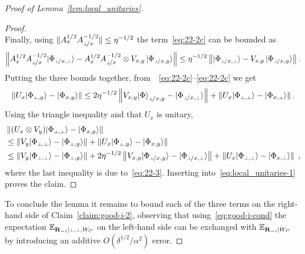 \begin{proof}[Proof of Lemma~\ref{lem:local_unitaries}]
\begin{proof}
$$$$
Finally, using $\|A_x^{1/2} A_\dummyx^{-1/2}\|\leq \eta^{-1/2}$ the term~\eqref{eq:22-2c} can be bounded as
$$
\left \| A_x^{1/2} A_\dummyx^{-1/2} \ket{\Phi_{\dummyx,\dummy}} - A_x^{1/2} A_\dummyx^{-1/2}  \otimes V_{x,y}\, \ket{\Phi_{\dummyx,y}} \right \| \leq \eta^{-1/2} \left \|  \ket{\Phi_{\dummyx,\dummy}} - V_{x,y}\, \ket{\Phi_{\dummyx,y}} \right \|.
$$
Putting the three bounds together, from~~\eqref{eq:22-2c}--\eqref{eq:22-2c} we get
\begin{align}
\left \| U_x \ket{\Phi_{\dummy,y}} - \ket{\Phi_{x,y}} \right \| \leq   2 \eta^{-1/2} \left \|  V_{x,y} \ket{\Phi}_{\dummyx,y} - \ket{{\Phi}_{\dummyx,\dummy}} \right \| + \left \|  U_x \ket{{\Phi}_{\dummy,\dummy}} -  \ket{{\Phi}_{x,\dummy}} \right \| .\label{eq:22-3}
\end{align}
Using the triangle inequality and that $U_x$ is unitary,
\begin{align*}
&\left \| (U_x \otimes V_y) \ket{{\Phi}_{\dummy,\dummy}} - \ket{{\Phi}_{x,y}} \right\| \\
&\leq  \left \| V_y \ket{{\Phi}_{\dummy,\dummy}} - \ket{{\Phi}_{\dummy,y}} \right \| + \left \| U_x \ket{{\Phi}_{\dummy,y}} - \ket{{\Phi}_{x,y}} \right \| \notag\\ 
&\leq  \left \| V_y \ket{{\Phi}_{\dummy,\dummy}} - \ket{{\Phi}_{\dummy,y}} \right \|  + 2\eta^{-1/2} \left \|  V_{x,y} \ket{\Phi_{\dummyx,y}} - \ket{{\Phi}_{\dummyx,\dummy}} \right \| +  \left \|  U_x \ket{{\Phi}_{\dummy,\dummy}} -  \ket{{\Phi}_{x,\dummy}} \right \|\;,
\end{align*}
where the last inequality is due to~\eqref{eq:22-3}. Inserting into~\eqref{eq:local_unitaries-1} proves the claim. 
\end{proof}

To conclude the lemma it remains to bound each of the three terms on the right-hand side of Claim~\ref{claim:good-i-2}, observing that using~\eqref{eq:good-i-cond} the expectation $ \Ex_{\bR_\mi | \dummy, \dummy, W_C}$ on the left-hand side can be exchanged with $ \operatorname*{\mathbb{E}}_{\mathbf{R}_{-i} | W_C}$ by introducing an additive $O(\delta^{1/2}/\alpha^2)$ error.


\end{proof}
